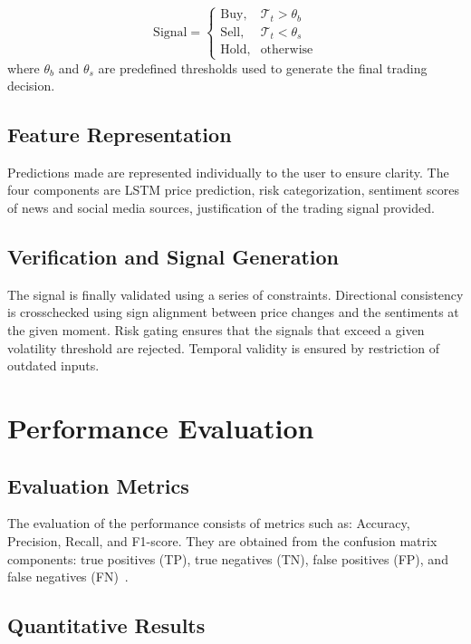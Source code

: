 \documentclass[twocolumn]{article}
\begin{document}
\begin{equation}
\text{Signal} =
\begin{cases}
\text{Buy}, & \mathcal{T}_t > \theta_b \\
\text{Sell}, & \mathcal{T}_t < \theta_s \\
\text{Hold}, & \text{otherwise}
\end{cases}
\label{eq:signal}
\end{equation}
where $\theta_b$ and $\theta_s$ are predefined thresholds used to generate the final trading decision.

\subsection{Feature Representation}

Predictions made are represented individually to the user to ensure clarity. The four components are LSTM price prediction, risk categorization, sentiment scores of news and social media sources, justification of the trading signal provided.

\subsection{Verification and Signal Generation}

The signal is finally validated using a series of constraints. Directional consistency is crosschecked using sign alignment between price changes and the sentiments at the given moment. Risk gating ensures that the signals that exceed a given volatility threshold are rejected. Temporal validity is ensured by restriction of outdated inputs. 

\section{Performance Evaluation}

\subsection{Evaluation Metrics}

The evaluation of the performance consists of metrics such as: Accuracy, Precision, Recall, and F1-score. They are obtained from the confusion matrix components: true positives (TP), true negatives (TN), false positives (FP), and false negatives (FN)~\cite{sokolova2020classification}.

\subsection{Quantitative Results}
\end{document}
